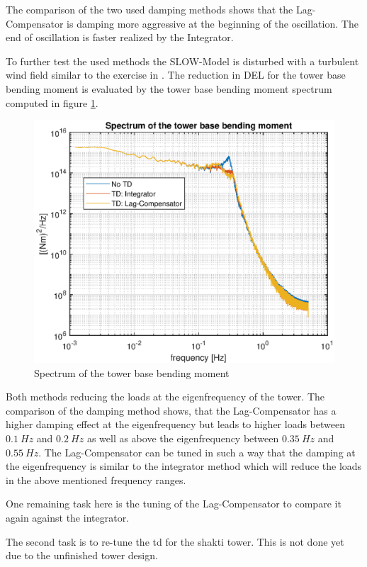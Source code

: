 The comparison of the two used damping methods shows that the Lag-Compensator is damping more aggressive at the beginning of the oscillation. The end of oscillation is faster realized by the Integrator.   

To further test the used methods the SLOW-Model is disturbed with a turbulent wind field similar to the exercise in \cite{SchlipfLecture}. The reduction in DEL for the tower base bending moment is evaluated by the tower base bending moment spectrum computed in figure \ref{fig:TDDEL}.

\begin{figure}[h]
	\centering	
	\includegraphics[width=12cm]{Figures/TDSpectrum.eps}
	\caption{Spectrum of the tower base bending moment}
	\label{fig:TDDEL}
\end{figure}
  
Both methods reducing the loads at the eigenfrequency of the tower. The comparison of the damping method shows, that the Lag-Compensator has a higher damping effect at the eigenfrequency but leads to higher loads between $\SI{0.1}{Hz}$ and $\SI{0.2}{Hz}$ as well as above the eigenfrequency between $\SI{0.35}{Hz}$ and $\SI{0.55}{Hz}$. The Lag-Compensator can be tuned in such a way that the damping at the eigenfrequency is similar to the integrator method which will reduce the loads in the above mentioned frequency ranges.

One remaining task here is the tuning of the Lag-Compensator to compare it again against the integrator. 

The second task is to re-tune the \gls{td} for the \gls{shakti} tower. 
This is not done yet due to the unfinished tower design.
    